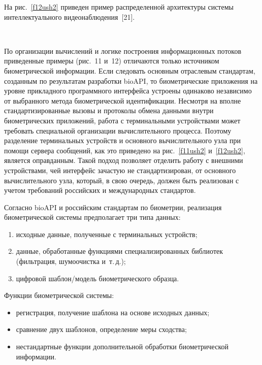  \begin{multicols}{2}


  
  На рис.~\ref{f12ush2} приведен пример распределенной архитектуры 
системы интеллектуального видеонаблюдения~[21]. 
  
    \begin{figure*} %
\vspace*{1pt}
\begin{center}
\mbox{%
\epsfxsize=143.44mm  
 }
\end{center}
\vspace*{-9pt}
  \vspace*{6pt}
  \end{figure*}
    
  По организации вычислений и логике по\-стро\-ения информационных потоков 
приведенные примеры (рис.~11 и~12) 
отличаются только источником биометрической 
информации. Если следовать основным %
 отрас\-ле\-вым стандартам, созданным по 
результатам разработки bioAPI, то биометрические приложения на уровне 
прикладного программного интерфейса устроены одинаково независимо 
от выбранного метода биометрической идентификации. Несмотря на вполне 
стандартизированные вызовы и протоколы обмена данными внутри 
биометрических приложений, работа с терминальными устройствами может 
требовать специальной организации вычислительного процесса. Поэтому 
разделение терминальных устройств и основного вычислительного узла при 
помощи сервера сообщений, как это приведено на рис.~\ref{f11ush2} 
и~\ref{f12ush2}, является оправданным. Такой подход позволяет отделить 
работу с внешними устройствами, чей интерфейс зачастую не
стандартизирован, от основного вычислительного узла, который, в свою очередь, 
должен быть реализован с учетом требований российских и международных 
стан\-дартов. 
  
  Согласно bioAPI и российским стандартам по биометрии, реализация 
биометрической системы предполагает три типа данных:
  \begin{enumerate}[(1)]
\item исходные данные, полученные с терминальных устройств;
\item данные, обработанные функциями специализированных библиотек 
(фильтрация, шумоочистка и~т.\,д.);
\item цифровой шаблон/модель биометрического образца.
\end{enumerate}
  Функции биометрической системы:
  \begin{itemize}
\item регистрация, получение шаблона на основе исходных данных;
\item сравнение двух шаблонов, определение меры сходства; 
\item нестандартные функции дополнительной обработки 
биометрической информации.
\end{itemize}


\end{multicols}
